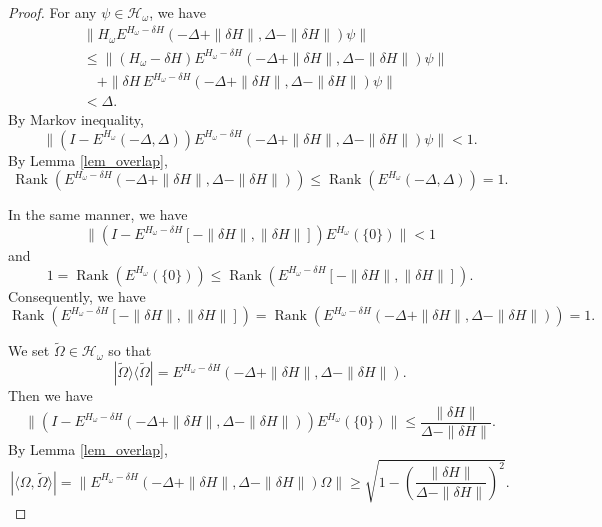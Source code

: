 \documentclass[11pt]{article}
\numberwithin{equation}{section}
\begin{document}
\begin{proof}
For any $\psi\in\mathcal{H}_\omega$, we have
\begin{align*}
&\|H_\omega E^{H_\omega-\delta H}(-\Delta+\|\delta H\|,\Delta-\|\delta H\|)\psi\|\\
&\leq \|(H_\omega-\delta H)E^{H_\omega-\delta H}(-\Delta+\|\delta H\|,\Delta-\|\delta H\|)\psi\|\\
&\quad+\|\delta H\,E^{H_\omega-\delta H}(-\Delta+\|\delta H\|,\Delta-\|\delta H\|)\psi\|\\
&<\Delta.
\end{align*}
By Markov inequality,
\[
\|(I-E^{H_\omega}(-\Delta,\Delta))E^{H_\omega-\delta H}(-\Delta+\|\delta H\|,\Delta-\|\delta H\|)\psi\|<1.
\]
By Lemma \ref{lem_overlap},
\[
\operatorname{Rank}(E^{H_\omega-\delta H}(-\Delta+\|\delta H\|,\Delta-\|\delta H\|)) \leq\operatorname{Rank}(E^{H_\omega}(-\Delta,\Delta))=1.
\]

In the same manner, we have
\[
\|(I-E^{H_\omega-\delta H}[-\|\delta H\|,\|\delta H\|])E^{H_\omega}(\{0\})\|<1
\]
and
\[
1=\operatorname{Rank}(E^{H_\omega}(\{0\}))\leq
\operatorname{Rank}(E^{H_\omega-\delta H}[-\|\delta H\|,\|\delta H\|]).
\]
Consequently, we have
\[
\operatorname{Rank}(E^{H_\omega-\delta H}[-\|\delta H\|,\|\delta H\|])=\operatorname{Rank}(E^{H_\omega-\delta H}(-\Delta+\|\delta H\|,\Delta-\|\delta H\|))=1.
\]

We set $\tilde{\Omega}\in\mathcal{H}_\omega$ so that 
\[
|\tilde{\Omega}\rangle\langle\tilde{\Omega}|
=E^{H_\omega-\delta H}(-\Delta+\|\delta H\|,\Delta-\|\delta H\|).
\]
Then we have
\[
\|(I-E^{H_\omega-\delta H}(-\Delta+\|\delta H\|,\Delta-\|\delta H\|))E^{H_\omega}(\{0\})\|\leq\frac{\|\delta H\|}{\Delta-\|\delta H\|}.
\]
By Lemma \ref{lem_overlap},
\[
|\langle\Omega,\tilde{\Omega}\rangle|=
\|E^{H_\omega-\delta H}(-\Delta+\|\delta H\|,\Delta-\|\delta H\|)\Omega\|
\geq \sqrt{1-\left(\frac{\|\delta H\|}{\Delta-\|\delta H\|}\right)^2}.
\]
\end{proof}
\end{document}
